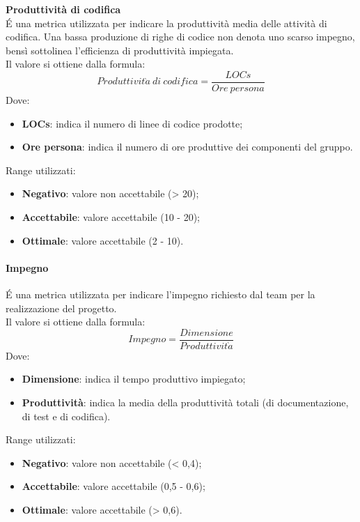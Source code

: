 \documentclass[../PianoDiQualifica.tex]{subfiles}
\begin{document}
				\textbf{Produttività di codifica}\\
				É una metrica utilizzata per indicare la produttività media delle attività di codifica. Una bassa produzione di righe di codice non denota uno scarso impegno, bensì sottolinea l'efficienza di produttività impiegata. \\Il valore si ottiene dalla formula:
				\begin{equation*}
					Produttivit\grave{a} \ di \ codifica = \frac{LOCs}{Ore \ persona}
				\end{equation*}
				Dove:
				\begin{itemize}
					\item \textbf{LOCs}: indica il numero di linee di codice prodotte;
					\item \textbf{Ore persona}: indica il numero di ore produttive dei componenti del gruppo.
				\end{itemize}
				Range utilizzati:
				\begin{itemize}
					\item \textbf{Negativo}: valore non accettabile (> 20);
					\item \textbf{Accettabile}: valore accettabile (10 - 20);
					\item \textbf{Ottimale}: valore accettabile (2 - 10).
				\end{itemize}

				\paragraph{Impegno}
				É una metrica utilizzata per indicare l'impegno richiesto dal team per la realizzazione del progetto. \\Il valore si ottiene dalla formula:
				\begin{equation*}
					Impegno = \frac{Dimensione}{Produttivit\grave{a}}
				\end{equation*}
				Dove:
				\begin{itemize}
					\item \textbf{Dimensione}: indica il tempo produttivo impiegato;
					\item \textbf{Produttività}: indica la media della produttività totali (di documentazione, di test e di codifica).
				\end{itemize}
				Range utilizzati:
				\begin{itemize}
					\item \textbf{Negativo}: valore non accettabile (< 0,4);
					\item \textbf{Accettabile}: valore accettabile (0,5 - 0,6);
					\item \textbf{Ottimale}: valore accettabile (> 0,6).
				\end{itemize}
\end{document}
